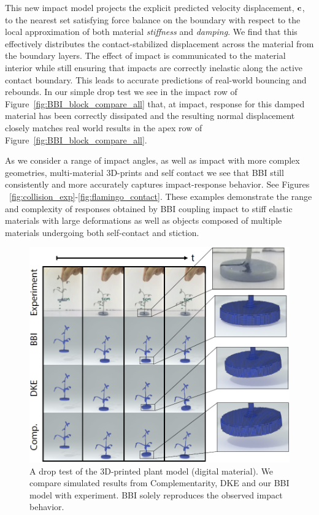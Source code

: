 This new impact model projects the explicit predicted velocity displacement, $\mathbf {c}$, to the nearest set satisfying force balance on the boundary with respect to the local approximation of both material \emph{stiffness} and \emph{damping}. We find that this effectively distributes the contact-stabilized displacement across the material from the boundary layers. The effect of impact is communicated to the material interior while still ensuring that impacts are correctly inelastic along the active contact boundary.
This leads to accurate predictions of real-world bouncing and rebounds. In our simple drop test we see in the impact row of Figure~\ref{fig:BBI_block_compare_all} that, at impact, response for this damped material has been correctly dissipated and the resulting normal displacement closely matches real world results in the apex row of Figure~\ref{fig:BBI_block_compare_all}. 

As we consider a range of impact angles, as well as impact with more complex geometries, multi-material 3D-prints and self contact we see that BBI still consistently and more accurately captures impact-response behavior. See Figures ~\ref{fig:collision_exp}-\ref{fig:flamingo_contact}. These examples demonstrate the range and complexity of responses obtained by BBI coupling impact to stiff elastic materials with large deformations as well as objects composed of multiple materials undergoing both self-contact and stiction.

\begin{figure}
	\centering
	\includegraphics[width=0.8\columnwidth]{images/plantDrop.png}	
	\caption{A drop test of the 3D-printed plant model (digital material). We compare simulated results from Complementarity, DKE and our BBI model with experiment. BBI solely reproduces the observed impact behavior.}
	\label{fig:BBI_block_compare_plant}
\end{figure}

